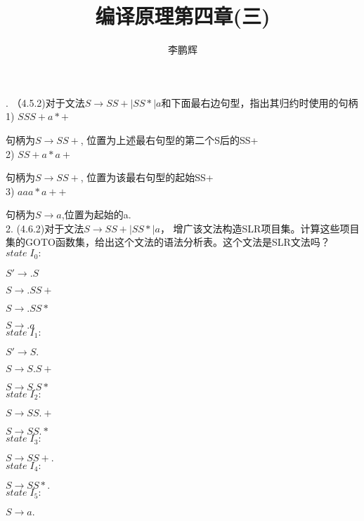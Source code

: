 \documentclass[a4paper, 10pt]{article}
\title{编译原理第四章(三)}
\author{李鹏辉}
\begin{document}
. （4.5.2)对于文法$S \rightarrow SS +|SS* |a $和下面最右边句型，指出其归约时使用的句柄\\

1) $SSS+a*+$

句柄为$S \rightarrow SS+$, 位置为上述最右句型的第二个S后的SS+\\

2) $SS+a*a+$

句柄为$S \rightarrow SS+$, 位置为该最右句型的起始SS+\\

3) $aaa*a++$

句柄为$S \rightarrow a$,位置为起始的a.\\

2. (4.6.2)对于文法$S\rightarrow SS+ |SS*|a$， 增广该文法构造SLR项目集。计算这些项目集的GOTO函数集，给出这个文法的语法分析表。这个文法是SLR文法吗？\\

$state \; I_0:$ 

$S' \rightarrow .S$

$S \rightarrow .SS+$

$S \rightarrow .SS*$

$S \rightarrow .a$\\


$state \; I_1:$

$S'\rightarrow S.$

$S\rightarrow S.S+$

$S\rightarrow S.S*$\\

$state \; I_2:$

$S\rightarrow SS.+$

$S \rightarrow SS.*$\\

$state \; I_3:$

$S \rightarrow SS+.$\\

$state \; I_4:$

$S\rightarrow SS*.$\\


$state \; I_5:$

$S \rightarrow a.$\\
\end{document}
